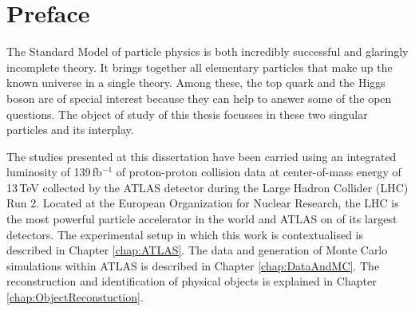 
\chapter*{Preface}


%
%					


The Standard Model of particle physics is both incredibly successful and glaringly incomplete theory. It brings together all  
elementary particles that make up the known universe in a single theory. Among these, the top quark and the Higgs boson are of special
interest because they can help to answer some of the open questions. The object of study of this thesis focusses in these two 
singular particles and its interplay. 


The studies presented at this dissertation have been carried using an integrated luminosity of 139$\,$fb$^{-1}$ 
of proton-proton collision data at center-of-mass energy of 13$\,$TeV collected by the ATLAS detector during the 
Large Hadron Collider (LHC) Run 2.  Located at the European Organization for Nuclear Research,
the LHC is the most powerful particle accelerator in the world and ATLAS on of its largest detectors. The experimental 
setup in which this work is contextualised is described in Chapter \ref{chap:ATLAS}. The data and generation
of Monte Carlo simulations within ATLAS is described in Chapter \ref{chap:DataAndMC}. The reconstruction 
and identification of physical objects is explained in Chapter \ref{chap:ObjectReconstuction}.

